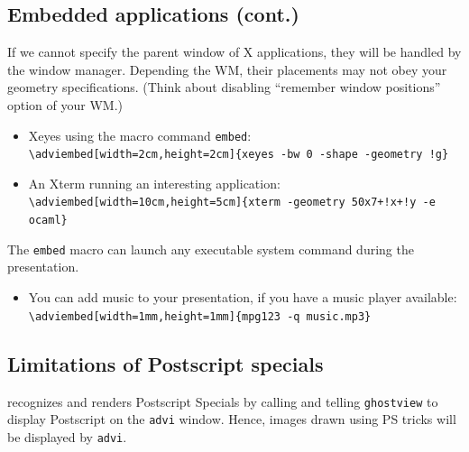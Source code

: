 \documentclass[12pt]{article}
\begin{document}
\newpage

\subsection* {Embedded applications (cont.)}

If we cannot specify the parent window of X applications,
they will be handled by the window manager.
Depending the WM, 
their placements may not obey your geometry specifications.
(Think about disabling ``remember window positions'' option of your WM.)

\begin{itemize}
 \item Xeyes using the macro command \verb|embed|:\\
   \verb|\adviembed[width=2cm,height=2cm]{xeyes -bw 0 -shape -geometry !g}|\\

 \item An Xterm running an interesting application:\\
   \verb|\adviembed[width=10cm,height=5cm]{xterm -geometry 50x7+!x+!y -e ocaml}|\\
\end{itemize}

The \verb|embed| macro can launch any executable system command during
the presentation. 
\begin{itemize}
 \item You can add music to your presentation, if you have a music
  player available:\\
  \verb|\adviembed[width=1mm,height=1mm]{mpg123 -q music.mp3}|
\end{itemize}

 {}
 {}

\newpage

\subsection* {Limitations of Postscript specials}

{\ActiveDVI} recognizes and renders Postscript Specials by calling and telling
\verb"ghostview" to display Postscript on the \verb"advi" window. 
Hence, images drawn using PS tricks will be displayed by \verb"advi". 
\end{document}
